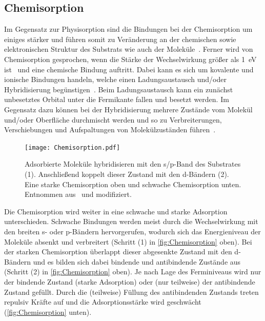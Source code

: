         \subsection{Chemisorption}
            Im Gegensatz zur Physisorption sind die Bindungen bei der Chemisorption um einiges stärker und führen somit zu Veränderung an der chemischen sowie elektronischen Struktur des Substrats wie auch der Moleküle~\cite{bergenti_spinterface_2019}.
            Ferner wird von Chemisorption gesprochen, wenn die Stärke der Wechselwirkung größer als \SI{1}{\electronvolt} ist~\cite{muscat_chemisorption_1978} und eine chemische Bindung auftritt.
            Dabei kann es sich um kovalente und ionische Bindungen handeln, welche einen Ladungsaustausch und/oder Hybridisierung begünstigen~\cite{harutyunyan_hybridisation_2013}.
            Beim Ladungsaustausch kann ein zunächst unbesetztes Orbital unter die Fermikante fallen und besetzt werden.
            Im Gegensatz dazu können bei der Hybridisierung mehrere Zustände vom Molekül und/oder Oberfläche durchmischt werden und so zu Verbreiterungen, Verschiebungen und Aufspaltungen von Molekülzuständen führen~\cite{IF_1}.

            \begin{figure}
                \centering
                \texttt{[image: Chemisorption.pdf]}
                \caption{Adsorbierte Moleküle hybridisieren mit den s/p-Band des Substrates (1).
                Anschließend koppelt dieser Zustand mit den d-Bändern (2).
                Eine starke Chemisorption oben und schwache Chemisorption unten.
                Entnommen aus~\cite{IF_1} und modifiziert.}
                \label{fig:Chemisorption}
            \end{figure}
            Die Chemisorption wird weiter in eine schwache und starke Adsorption unterschieden.
            Schwache Bindungen werden meist durch die Wechselwirkung mit den breiten s- oder p-Bändern hervorgerufen, wodurch sich das Energieniveau der Moleküle absenkt und verbreitert (Schritt (1) in \autoref{fig:Chemisorption} oben).
            Bei der starken Chemisorption überlappt dieser abgesenkte Zustand mit den d-Bändern und es bilden sich dabei bindende und antibindende Zustände aus (Schritt (2) in \autoref{fig:Chemisorption} oben).
            Je nach Lage des Ferminiveaus wird nur der bindende Zustand (starke Adsorption) oder (nur teilweise) der antibindende Zustand gefüllt.
            Durch die (teilweise) Füllung des antibindenden Zustands treten repulsiv Kräfte auf und die Adsorptionsstärke wird geschwächt (\autoref{fig:Chemisorption} unten).

